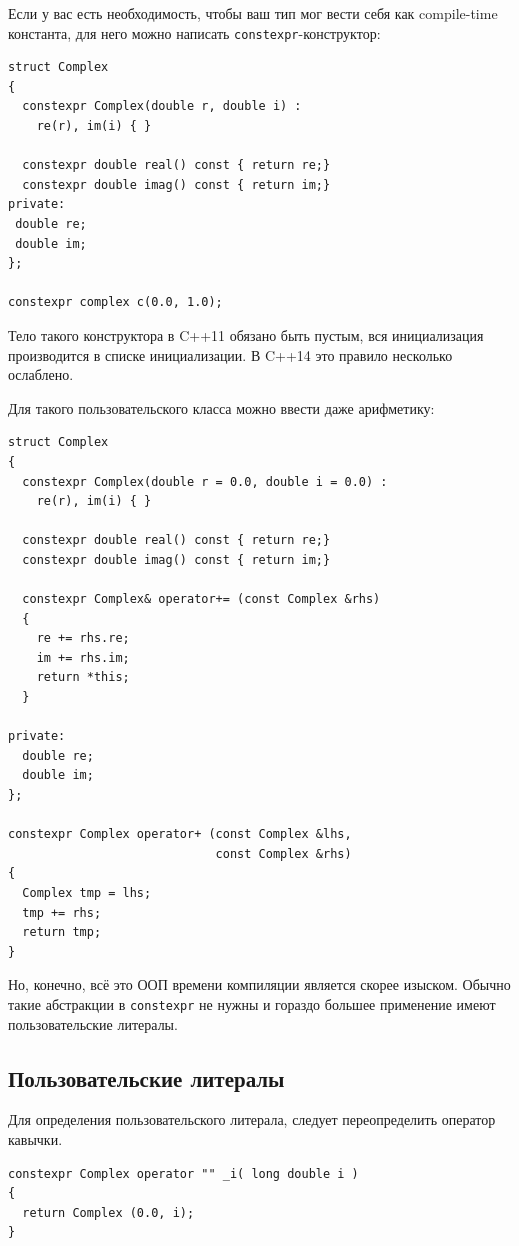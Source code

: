 \documentclass[a4paper,12pt,oneside]{book}
\begin{document}
Если у вас есть необходимость, чтобы ваш тип мог вести себя как compile-time константа, для него можно написать \lstinline!constexpr!-конструктор:

\begin{lstlisting}
struct Complex
{
  constexpr Complex(double r, double i) : 
    re(r), im(i) { }

  constexpr double real() const { return re;}
  constexpr double imag() const { return im;}
private:
 double re;
 double im;
};

constexpr complex c(0.0, 1.0);
\end{lstlisting}

Тело такого конструктора в C++11 обязано быть пустым, вся инициализация производится в списке инициализации. В C++14 это правило несколько ослаблено.

Для такого пользовательского класса можно ввести даже арифметику:

\begin{lstlisting}
struct Complex
{
  constexpr Complex(double r = 0.0, double i = 0.0) : 
    re(r), im(i) { }

  constexpr double real() const { return re;}
  constexpr double imag() const { return im;}

  constexpr Complex& operator+= (const Complex &rhs)
  {
    re += rhs.re;
    im += rhs.im;
    return *this;
  }

private:
  double re;
  double im;
};

constexpr Complex operator+ (const Complex &lhs, 
                             const Complex &rhs)
{
  Complex tmp = lhs;
  tmp += rhs;
  return tmp;
}
\end{lstlisting}

Но, конечно, всё это ООП времени компиляции является скорее изыском. Обычно такие абстракции в \lstinline!constexpr! не нужны и гораздо большее применение имеют пользовательские литералы.

\subsection{Пользовательские литералы}\label{Constexpr:userliterals}

Для определения пользовательского литерала, следует переопределить оператор кавычки.

\begin{lstlisting}
constexpr Complex operator "" _i( long double i )
{
  return Complex (0.0, i);
}
\end{lstlisting}
\end{document}
